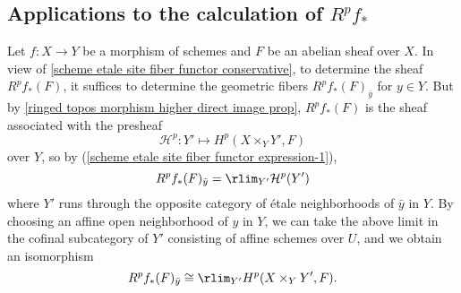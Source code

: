 \subsection{Applications to the calculation of \texorpdfstring{$R^pf_*$}{Rf}}
Let $f:X\to Y$ be a morphism of schemes and $F$ be an abelian sheaf over $X$. In view of \cref{scheme etale site fiber functor conservative}, to determine the sheaf $R^pf_*(F)$, it suffices to determine the geometric fibers $R^pf_*(F)_{\bar{y}}$ for $y\in Y$. But by \cref{ringed topos morphism higher direct image prop}, $R^pf_*(F)$ is the sheaf associated with the presheaf
\[\mathcal{H}^p:Y'\mapsto H^p(X\times_YY',F)\]
over $Y$, so by (\ref{scheme etale site fiber functor expression-1}),
\[R^pf_*(F)_{\bar{y}}=\rlim_{Y'}\mathcal{H}^p(Y')\]
where $Y'$ runs through the opposite category of \'etale neighborhoods of $\bar{y}$ in $Y$. By choosing an affine open neighborhood of $y$ in $Y$, we can take the above limit in the cofinal subcategory of $Y'$ consisting of affine schemes over $U$, and we obtain an isomorphism
\begin{equation}\label{scheme etale site higher direct image fiber morphism-1}
R^pf_*(F)_{\bar{y}}\cong \rlim_{Y'} H^p(X\times_YY',F).
\end{equation}

